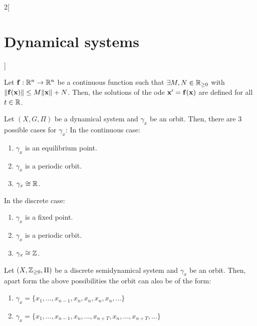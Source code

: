 \documentclass[../../../main_math.tex]{subfiles}
\begin{document}
\begin{multicols}{2}[\section{Dynamical systems}]
  \begin{lemma}
    Let $\boldsymbol{\mathrm{f}}:\mathbb{R}^n\rightarrow\mathbb{R}^n$ be a continuous function such that $\exists M,N\in\mathbb{R}_{\geq 0}$ with $\|\boldsymbol{\mathrm{f}}(\boldsymbol{\mathrm{x}})\|\leq M\|\boldsymbol{\mathrm{x}}\|+N$. Then, the solutions of the ode $\boldsymbol{\mathrm{x}}' =\boldsymbol{\mathrm{f}}(\boldsymbol{\mathrm{x}})$ are defined for all $t\in\mathbb{R}$.
  \end{lemma}
  \begin{theorem}
    Let $(X,G,\Pi)$ be a dynamical system and $\gamma_x$ be an orbit. Then, there are 3 possible cases for $\gamma_x$:
    In the continuous case:
    \begin{enumerate}
      \item $\gamma_x$ is an equilibrium point.
      \item $\gamma_x$ is a periodic orbit.
      \item $\gamma_x\cong\mathbb{R}$.
    \end{enumerate}
    In the discrete case:
    \begin{enumerate}
      \item $\gamma_x$ is a fixed point.
      \item $\gamma_x$ is a periodic orbit.
      \item $\gamma_x\cong\mathbb{Z}$.
    \end{enumerate}
  \end{theorem}
  \begin{theorem}
    Let $(X,\mathbb{Z}_{\geq 0},\Pi)$ be a discrete semidynamical system and $\gamma_x$ be an orbit. Then, apart form the above possibilities the orbit can also be of the form:
    \begin{enumerate}
      \item $\gamma_x=\{x_1,\ldots,x_{n-1},x_n,x_n,x_n,x_n,\ldots\}$
      \item $\gamma_x=\{x_1,\ldots,x_{n-1},x_n,\ldots,x_{n+T},x_n,\ldots,x_{n+T},\ldots\}$
    \end{enumerate}
  \end{theorem}

\end{multicols}
\end{document}
